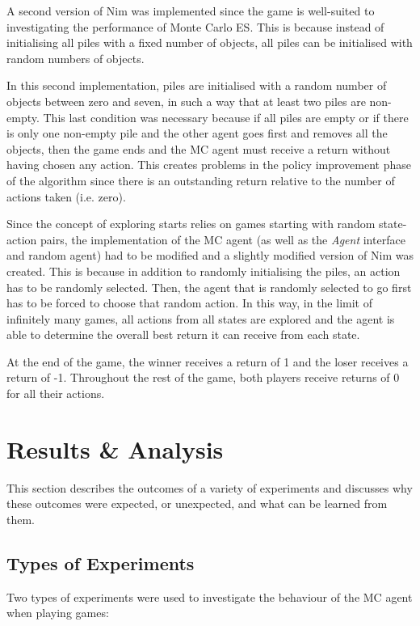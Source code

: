 \documentclass[11pt,a4paper]{report}
\begin{document}
A second version of Nim was implemented since the game is well-suited to investigating the performance of Monte Carlo ES. This is because instead of initialising all piles with a fixed number of objects, all piles can be initialised with random numbers of objects.

In this second implementation, piles are initialised with a random number of objects between zero and seven, in such a way that at least two piles are non-empty. This last condition was necessary because if all piles are empty or if there is only one non-empty pile and the other agent goes first and removes all the objects, then the game ends and the MC agent must receive a return without having chosen any action. This creates problems in the policy improvement phase of the algorithm since there is an outstanding return relative to the number of actions taken (i.e. zero).

Since the concept of exploring starts relies on games starting with random state-action pairs, the implementation of the MC agent (as well as the \emph{Agent} interface and random agent) had to be modified and a slightly modified version of Nim was created. This is because in addition to randomly initialising the piles, an action has to be randomly selected. Then, the agent that is randomly selected to go first has to be forced to choose that random action. In this way, in the limit of infinitely many games, all actions from all states are explored and the agent is able to determine the overall best return it can receive from each state.

At the end of the game, the winner receives a return of 1 and the loser receives a return of -1. Throughout the rest of the game, both players receive returns of 0 for all their actions.


\chapter{Results \& Analysis}

This section describes the outcomes of a variety of experiments and discusses why these outcomes were expected, or unexpected, and what can be learned from them.


\section{Types of Experiments}
\label{sec:experiment-types}

Two types of experiments were used to investigate the behaviour of the MC agent when playing games:
\end{document}
